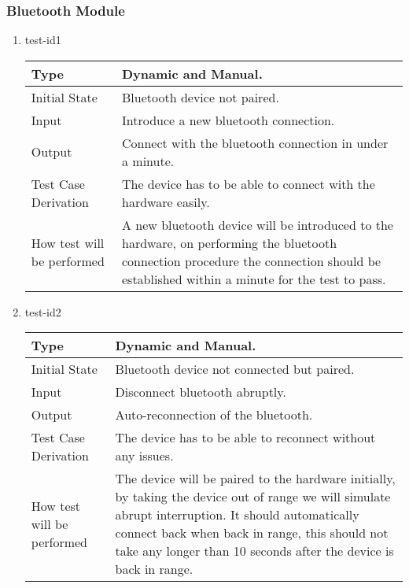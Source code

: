 \documentclass[12pt, titlepage]{article}
\begin{document}
\subsubsection{Bluetooth Module}

\begin{enumerate}

\item{test-id1\\}

\begin{tabular}{ |p{5cm}||p{7cm}| }
    \hline
    Type & Dynamic and Manual. \\
    \hline
    Initial State  &  Bluetooth device not paired. \\
    \hline
    Input &   Introduce a new bluetooth connection. \\
    \hline
    Output &   Connect with the bluetooth connection in under a minute.  \\
    \hline
    Test Case Derivation &   The device has to be able to connect with the hardware easily. \\
    \hline
    How test will be performed & A new bluetooth device will be introduced to the hardware, on performing the bluetooth connection procedure the connection should be established within a minute for the test to pass. \\
    \hline
\end{tabular}

\item{test-id2\\}

\begin{tabular}{ |p{5cm}||p{7cm}| }
    \hline
    Type & Dynamic and Manual. \\
    \hline
    Initial State  &  Bluetooth device not connected but paired. \\
    \hline
    Input &   Disconnect bluetooth abruptly. \\
    \hline
    Output &   Auto-reconnection of the bluetooth.  \\
    \hline
    Test Case Derivation &   The device has to be able to reconnect without any issues. \\
    \hline
    How test will be performed & The device will be paired to the hardware initially, by taking the device out of range we will simulate abrupt interruption. It should automatically connect back when back in range, this should not take any longer than 10 seconds after the device is back in range. \\
    \hline
\end{tabular}

\end{enumerate}
\end{document}
